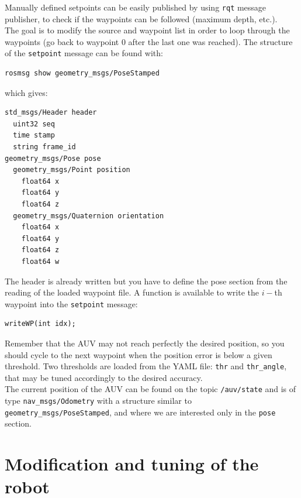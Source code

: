 \documentclass{ecnreport}
\begin{document}
Manually defined setpoints can be easily published by using \texttt{rqt} message publisher, to check if the waypoints can be followed (maximum depth, etc.).\\

The goal is to modify the source and waypoint list in order to loop through the waypoints (go back to waypoint 0 after the last one was reached).
The structure of the \texttt{setpoint} message can be found with:
\begin{center}
\begin{lstlisting}
rosmsg show geometry_msgs/PoseStamped
\end{lstlisting}
\end{center}
which gives:
\begin{center}
\begin{lstlisting}
std_msgs/Header header
  uint32 seq
  time stamp
  string frame_id
geometry_msgs/Pose pose
  geometry_msgs/Point position
    float64 x
    float64 y
    float64 z
  geometry_msgs/Quaternion orientation
    float64 x
    float64 y
    float64 z
    float64 w
\end{lstlisting}
\end{center}
The header is already written but you have to define the pose section from the reading of the loaded waypoint file.
A function is available to write the $i-$th waypoint into the \texttt{setpoint} message:
\begin{center}\cppstyle
\begin{lstlisting}
writeWP(int idx);
\end{lstlisting}
\end{center}
Remember that the AUV may not reach perfectly the desired position, so you should cycle to the next waypoint when the position error is below a given threshold.
Two thresholds are loaded from the YAML file: \texttt{thr} and \texttt{thr\_angle}, that may be tuned accordingly to the desired accuracy.\\
The current position of the AUV can be found on the topic \texttt{/auv/state} and is of type \texttt{nav\_msgs/Odometry} with a structure similar to \texttt{geometry\_msgs/PoseStamped}, and where we are interested only
in the \texttt{pose} section.\\


\section{Modification and tuning of the robot}
\end{document}
